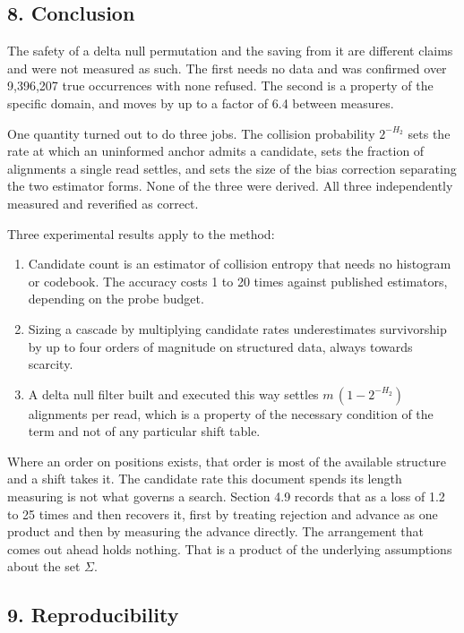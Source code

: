 \subsection{8. Conclusion}

The safety of a delta null permutation and the saving from it are different claims and were not
measured as such. The first needs no data and was confirmed over 9,396,207 true occurrences with
none refused. The second is a property of the specific domain, and moves by up to a factor of 6.4
between measures.

One quantity turned out to do three jobs. The collision probability \(2^{-H_2}\) sets the rate at
which an uninformed anchor admits a candidate, sets the fraction of alignments a single read
settles, and sets the size of the bias correction separating the two estimator forms. None of the
three were derived. All three independently measured and reverified as correct.

Three experimental results apply to the method:

\begin{enumerate}
  \item Candidate count is an estimator of collision entropy that needs no histogram or codebook.
    The accuracy costs 1 to 20 times against published estimators, depending on the probe budget.
  \item Sizing a cascade by multiplying candidate rates underestimates survivorship by up to four
    orders of magnitude on structured data, always towards scarcity.
  \item A delta null filter built and executed this way settles \(m\,(1 - 2^{-H_2})\) alignments
    per read, which is a property of the necessary condition of the term and not of any particular
    shift table.
\end{enumerate}

Where an order on positions exists, that order is most of the available structure and a shift takes it. The candidate rate this document spends its length measuring is not what governs a search. Section 4.9 records that as a loss of 1.2 to 25 times and then recovers it, first by treating rejection and advance as one product and then by measuring the advance directly. The arrangement that comes out ahead holds nothing. That is a product of the underlying assumptions about the set $\Sigma$.

\subsection{9. Reproducibility}

